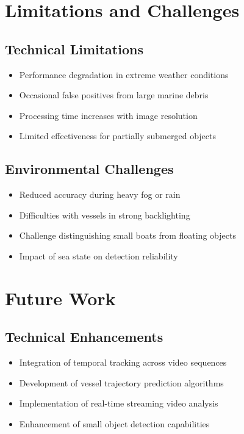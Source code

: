 \documentclass[12pt,a4paper]{report}
\begin{document}
\section{Limitations and Challenges}

\subsection{Technical Limitations}
\begin{itemize}
    \item Performance degradation in extreme weather conditions
    \item Occasional false positives from large marine debris
    \item Processing time increases with image resolution
    \item Limited effectiveness for partially submerged objects
\end{itemize}

\subsection{Environmental Challenges}
\begin{itemize}
    \item Reduced accuracy during heavy fog or rain
    \item Difficulties with vessels in strong backlighting
    \item Challenge distinguishing small boats from floating objects
    \item Impact of sea state on detection reliability
\end{itemize}

\section{Future Work}

\subsection{Technical Enhancements}
\begin{itemize}
    \item Integration of temporal tracking across video sequences
    \item Development of vessel trajectory prediction algorithms
    \item Implementation of real-time streaming video analysis
    \item Enhancement of small object detection capabilities
\end{itemize}
\end{document}
